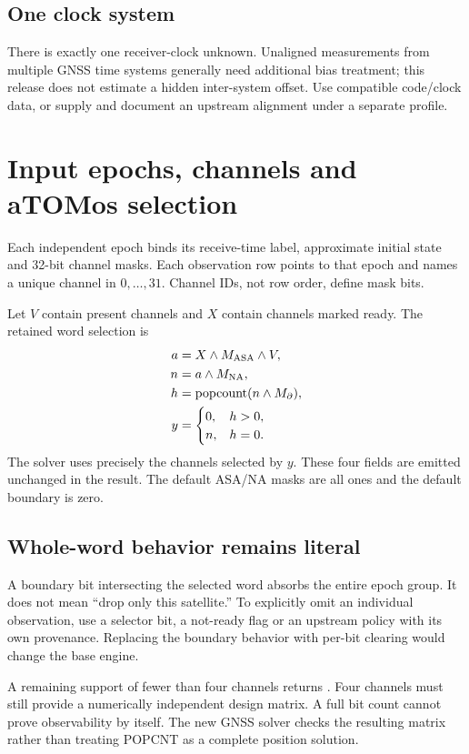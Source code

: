 \subsection{One clock system}
There is exactly one receiver-clock unknown. Unaligned measurements from multiple
GNSS time systems generally need additional bias treatment; this release does not
estimate a hidden inter-system offset. Use compatible code/clock data, or supply
and document an upstream alignment under a separate profile.
\clearpage

\section{Input epochs, channels and aTOMos selection}
Each independent epoch binds its receive-time label, approximate initial state and
32-bit channel masks. Each observation row points to that epoch and names a unique
channel in $0,\ldots,31$. Channel IDs, not row order, define mask bits.

Let $V$ contain present channels and $X$ contain channels marked ready. The retained
word selection is
\begin{align}
a&=X\land M_{\rm ASA}\land V,\\
n&=a\land M_{\rm NA},\\
h&=\operatorname{popcount}(n\land M_\partial),\\
y&=\begin{cases}0,&h>0,\\n,&h=0.\end{cases}
\end{align}
The solver uses precisely the channels selected by $y$. These four fields are emitted
unchanged in the result. The default ASA/NA masks are all ones and the default boundary
is zero. \base\ 

\subsection{Whole-word behavior remains literal}
A boundary bit intersecting the selected word absorbs the entire epoch group. It
does not mean ``drop only this satellite.'' To explicitly omit an individual observation,
use a selector bit, a not-ready flag or an upstream policy with its own provenance.
Replacing the boundary behavior with per-bit clearing would change the base engine.

A remaining support of fewer than four channels returns . Four channels
must still provide a numerically independent design matrix. A full bit count cannot
prove observability by itself. The new GNSS solver checks the resulting matrix rather
than treating POPCNT as a complete position solution. 

